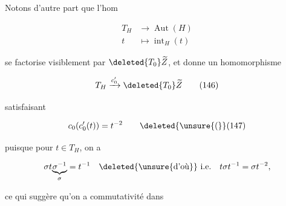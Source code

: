 Notons d'autre part que l'hom

\[
\begin{aligned}
T_H&\longrightarrow\operatorname{Aut}(H)\\
t&\longmapsto\operatorname{int}_H(t)
\end{aligned}
\]

se factorise visiblement par $\deleted{T_0}\widetilde Z$, et donne un homomorphisme

\[
T_H\xrightarrow{c'_0}\deleted{T_0}\widetilde Z\tag*{(146)}
\]

satisfaisant

\[
c_0(c'_0(t))=t^{-2}\tag*{\deleted{\unsure{(}}(147)}
\]

puisque pour $t\in T_H$, on a

\[
\sigma t\underset{\sigma}{\underbrace{\sigma^{-1}}}=t^{-1}\quad\deleted{\unsure{\text{d'où}}}\ \text{i.e.}\quad t\sigma t^{-1}=\sigma t^{-2},
\]

ce qui suggère qu'on a commutativité dans
